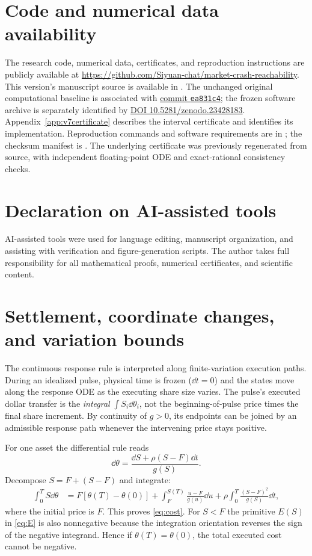 \documentclass[review,hidelinks,onefignum,onetabnum]{siamonline250211}
\begin{document}
\section*{Code and numerical data availability}
The research code, numerical data, certificates, and reproduction instructions are publicly available at \url{https://github.com/Siyuan-chat/market-crash-reachability}. This version's manuscript source is available in . The unchanged original computational baseline is associated with \href{https://github.com/Siyuan-chat/market-crash-reachability/tree/ea831c44f5b77b7039dd6644f6f0a791bb74d176}{commit \texttt{ea831c4}}; the frozen software archive is separately identified by \href{https://doi.org/10.5281/zenodo.23428183}{DOI 10.5281/zenodo.23428183}. Appendix~\ref{app:v7certificate} describes the interval certificate and identifies its implementation. Reproduction commands and software requirements are in ; the checksum manifest is . The underlying certificate was previously regenerated from source, with independent floating-point ODE and exact-rational consistency checks.

\section*{Declaration on AI-assisted tools}
AI-assisted tools were used for language editing, manuscript organization, and assisting with verification and figure-generation scripts. The author takes full responsibility for all mathematical proofs, numerical certificates, and scientific content.

\appendix
\section{Settlement, coordinate changes, and variation bounds}\label{app:accounting}
The continuous response rule is interpreted along finite-variation execution paths. During an idealized pulse, physical time is frozen ($\dd t=0$) and the states move along the response ODE as the executing share size varies. The pulse's executed dollar transfer is the \emph{integral} $\int S_i\dd\theta_i$, not the beginning-of-pulse price times the final share increment. By continuity of $g>0$, its endpoints can be joined by an admissible response path whenever the intervening price stays positive.

For one asset the differential rule reads
\begin{equation}\label{eq:appendix-s}
\dd\theta=\frac{\dd S+\rho(S-F)\dd t}{g(S)}.
\end{equation}
Decompose $S=F+(S-F)$ and integrate:
\begin{align*}
\int_0^T S\dd\theta
&=F[\theta(T)-\theta(0)]
+\int_F^{S(T)}\frac{u-F}{g(u)}\dd u
+\rho\int_0^T\frac{(S-F)^2}{g(S)}\dd t,
\end{align*}
where the initial price is $F$. This proves \eqref{eq:cost}. For $S<F$ the primitive $E(S)$ in \eqref{eq:E} is also nonnegative because the integration orientation reverses the sign of the negative integrand. Hence if $\theta(T)=\theta(0)$, the total executed cost cannot be negative.
\end{document}
